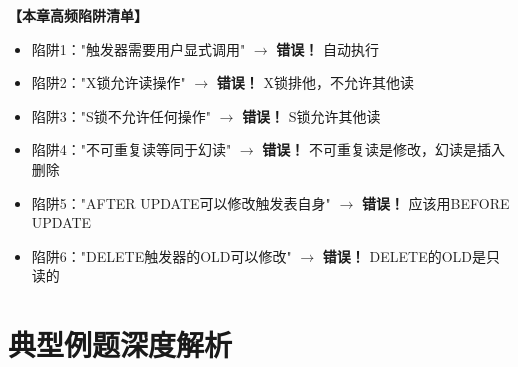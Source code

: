 \documentclass[12pt, a4paper]{article}
\newenvironment{bluebox}[1]{%
  \begin{trivlist}
  \item[\hskip\labelsep \textbf{#1}]
  \setlength{\parskip}{0.5ex}
  \setlength{\itemsep}{0.5ex}
}{%
  \end{trivlist}
  }
\begin{document}
\begin{bluebox}{高频陷阱清单}
	\textbf{【本章高频陷阱清单】}

	\begin{itemize}
		\item 陷阱1："触发器需要用户显式调用" $\rightarrow$ \textbf{错误！} 自动执行
		\item 陷阱2："X锁允许读操作" $\rightarrow$ \textbf{错误！} X锁排他，不允许其他读
		\item 陷阱3："S锁不允许任何操作" $\rightarrow$ \textbf{错误！} S锁允许其他读
		\item 陷阱4："不可重复读等同于幻读" $\rightarrow$ \textbf{错误！} 不可重复读是修改，幻读是插入删除
		\item 陷阱5："AFTER UPDATE可以修改触发表自身" $\rightarrow$ \textbf{错误！} 应该用BEFORE UPDATE
		\item 陷阱6："DELETE触发器的OLD可以修改" $\rightarrow$ \textbf{错误！} DELETE的OLD是只读的
	\end{itemize}
\end{bluebox}

\section{典型例题深度解析}
\end{document}
